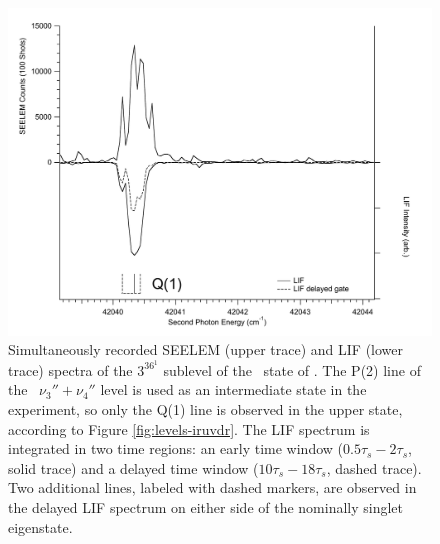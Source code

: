 \documentclass[12pt]{mitthesis}
\begin{document}
\begin{figure}
  \caption{Simultaneously recorded SEELEM (upper trace) and LIF (lower
    trace) spectra of the $3^36^1$  sublevel of the \astate\
    state of .  The P(2) line of the \xstate\ $\nu_3'' +
    \nu_4''$ level is used as an intermediate state in the experiment,
    so only the Q(1) line is observed in the upper state, according to
    Figure \ref{fig:levels-iruvdr}.  The LIF spectrum is integrated in
    two time regions: an early time window ($0.5\tau_s-2\tau_s$, solid
    trace) and a delayed time window ($10\tau_s-18\tau_s$, dashed
    trace).  Two additional lines, labeled with dashed markers, are
    observed in the delayed LIF spectrum on either side of the
    nominally singlet eigenstate.}
  \label{fig:3361-q1}
  \centering
  \includegraphics[width=6in]{spectrum-3361-q1-split.pdf}
\end{figure}
\end{document}
